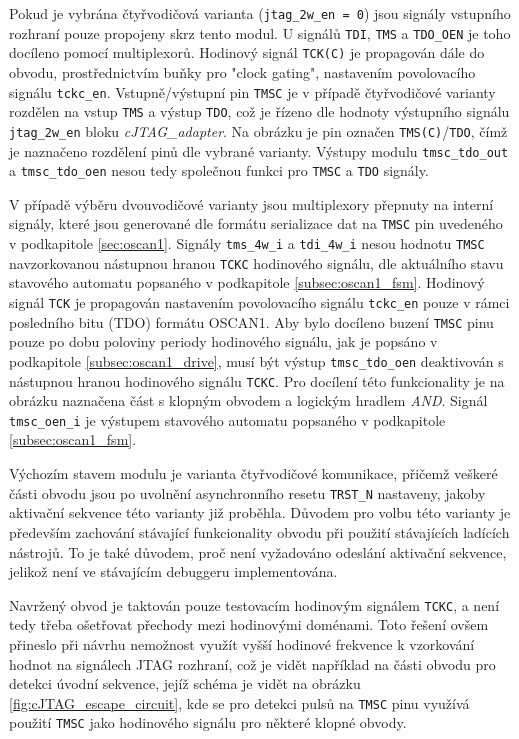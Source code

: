Pokud je vybrána čtyřvodičová varianta (\texttt{jtag\_2w\_en = 0}) jsou signály vstupního rozhraní pouze propojeny skrz tento modul. U signálů \texttt{\acs{TDI}}, \texttt{\acs{TMS}} a \texttt{TDO\_OEN} je toho docíleno pomocí multiplexorů. Hodinový signál \texttt{TCK(C)} je propagován dále do obvodu, prostřednictvím buňky pro "clock gating", nastavením povolovacího signálu \texttt{tckc\_en}. Vstupně/výstupní pin \texttt{\acs{TMSC}} je v případě čtyřvodičové varianty rozdělen na vstup \texttt{\acs{TMS}} a výstup \texttt{\acs{TDO}}, což je řízeno dle hodnoty výstupního signálu \texttt{jtag\_2w\_en} bloku \textit{cJTAG\_adapter}. Na obrázku je pin označen \texttt{TMS(C)}/\texttt{TDO}, čímž je naznačeno rozdělení pinů dle vybrané varianty. Výstupy modulu \texttt{tmsc\_tdo\_out} a \texttt{tmsc\_tdo\_oen} nesou tedy společnou funkci pro \texttt{\acs{TMSC}} a \texttt{\acs{TDO}} signály.

V případě výběru dvouvodičové varianty jsou multiplexory přepnuty na interní signály, které jsou generované dle formátu serializace dat na \texttt{\acs{TMSC}} pin uvedeného v podkapitole \ref{sec:oscan1}. Signály \texttt{tms\_4w\_i} a \texttt{tdi\_4w\_i} nesou hodnotu \texttt{\acs{TMSC}} navzorkovanou nástupnou hranou \texttt{\acs{TCKC}} hodinového signálu, dle aktuálního stavu stavového automatu popsaného v podkapitole \ref{subsec:oscan1_fsm}. Hodinový signál \texttt{\acs{TCK}} je propagován nastavením povolovacího signálu \texttt{tckc\_en} pouze v rámci posledního bitu (TDO) formátu OSCAN1. Aby bylo docíleno buzení \texttt{\acs{TMSC}} pinu pouze po dobu poloviny periody hodinového signálu, jak je popsáno v podkapitole \ref{subsec:oscan1_drive}, musí být výstup \texttt{tmsc\_tdo\_oen} deaktivován s nástupnou hranou hodinového signálu \texttt{\acs{TCKC}}. Pro docílení této funkcionality je na obrázku naznačena část s klopným obvodem a logickým hradlem \textit{AND}. Signál \texttt{tmsc\_oen\_i} je výstupem stavového automatu popsaného v podkapitole \ref{subsec:oscan1_fsm}.

Výchozím stavem modulu je varianta čtyřvodičové komunikace, přičemž veškeré části obvodu jsou po uvolnění asynchronního resetu \texttt{TRST\_N} nastaveny, jakoby aktivační sekvence této varianty již proběhla. Důvodem pro volbu této varianty je především zachování stávající funkcionality obvodu při použití stávajících ladících nástrojů. To je také důvodem, proč není vyžadováno odeslání aktivační sekvence, jelikož není ve stávajícím debuggeru implementována.

Navržený obvod je taktován pouze testovacím hodinovým signálem \texttt{\acs{TCKC}}, a není tedy třeba ošetřovat přechody mezi hodinovými doménami. Toto řešení ovšem přineslo při návrhu nemožnost využít vyšší hodinové frekvence k vzorkování hodnot na signálech \acs{JTAG} rozhraní, což je vidět například na části obvodu pro detekci úvodní sekvence, jejíž schéma je vidět na obrázku \ref{fig:cJTAG_escape_circuit}, kde se pro detekci pulsů na \texttt{\acs{TMSC}} pinu využívá použití \texttt{\acs{TMSC}} jako hodinového signálu pro některé klopné obvody.

